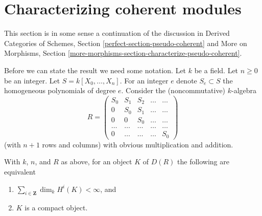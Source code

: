 \section{Characterizing coherent modules}
\label{section-coherent}

\noindent
This section is in some sense a continuation of the discussion
in Derived Categories of Schemes, Section \ref{perfect-section-pseudo-coherent}
and More on Morphisms, Section
\ref{more-morphisms-section-characterize-pseudo-coherent}.

\medskip\noindent
Before we can state the result we need some notation.
Let $k$ be a field. Let $n \geq 0$ be an integer.
Let $S = k[X_0, \ldots, X_n]$. For an integer $e$ denote
$S_e \subset S$ the homogeneous polynomials of degree $e$.
Consider the (noncommutative) $k$-algebra
$$
R =
\left(
\begin{matrix}
S_0 & S_1 & S_2 & \ldots & \ldots \\
0 & S_0 & S_1 & \ldots & \ldots\\
0 & 0 & S_0 & \ldots & \ldots \\
\ldots & \ldots & \ldots & \ldots & \ldots \\
0 & \ldots & \ldots & \ldots & S_0
\end{matrix}
\right)
$$
(with $n + 1$ rows and columns) with obvious multiplication and addition.

\begin{lemma}
\label{lemma-perfect-for-R}
With $k$, $n$, and $R$ as above, for an object $K$ of $D(R)$
the following are equivalent
\begin{enumerate}
\item $\sum_{i \in \mathbf{Z}} \dim_k H^i(K) < \infty$, and
\item $K$ is a compact object.
\end{enumerate}
\end{lemma}

